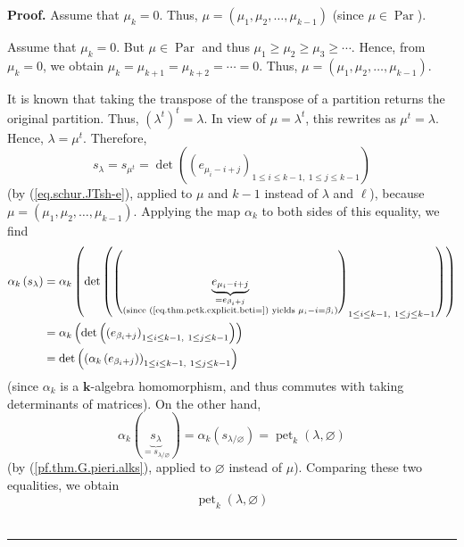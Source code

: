 \documentclass[numbers=enddot,12pt,final,onecolumn,notitlepage]{scrartcl}%
\theoremstyle{definition}
\newenvironment{proof}[1][Proof]{\noindent\textbf{#1.} }{\ \rule{0.5em}{0.5em}}
\newenvironment{verlong}{}{}
\newenvironment{vershort}{}{}
\begin{document}
\begin{proof}
\begin{vershort}
Assume that $\mu_{k}=0$. Thus, $\mu=\left(  \mu_{1},\mu_{2},\ldots,\mu
_{k-1}\right)  $ (since $\mu\in\operatorname*{Par}$).
\end{vershort}

\begin{verlong}
Assume that $\mu_{k}=0$. But $\mu\in\operatorname*{Par}$ and thus $\mu_{1}%
\geq\mu_{2}\geq\mu_{3}\geq\cdots$. Hence, from $\mu_{k}=0$, we obtain $\mu
_{k}=\mu_{k+1}=\mu_{k+2}=\cdots=0$. Thus, $\mu=\left(  \mu_{1},\mu_{2}%
,\ldots,\mu_{k-1}\right)  $.
\end{verlong}

It is known that taking the transpose of the transpose of a partition returns
the original partition. Thus, $\left(  \lambda^{t}\right)  ^{t}=\lambda$. In
view of $\mu=\lambda^{t}$, this rewrites as $\mu^{t}=\lambda$. Hence,
$\lambda=\mu^{t}$. Therefore,%
\[
s_{\lambda}=s_{\mu^{t}}=\det\left(  \left(  e_{\mu_{i}-i+j}\right)  _{1\leq
i\leq k-1,\ 1\leq j\leq k-1}\right)
\]
(by (\ref{eq.schur.JTsh-e}), applied to $\mu$ and $k-1$ instead of $\lambda$
and $\ell$), because $\mu=\left(  \mu_{1},\mu_{2},\ldots,\mu_{k-1}\right)  $.
Applying the map $\alpha_{k}$ to both sides of this equality, we find%
\begin{align*}
\alpha_{k}\left(  s_{\lambda}\right)   &  =\alpha_{k}\left(  \det\left(
\left(  \underbrace{e_{\mu_{i}-i+j}}_{\substack{=e_{\beta_{i}+j}\\\text{(since
(\ref{eq.thm.petk.explicit.beti=}) yields }\mu_{i}-i=\beta_{i}\text{)}%
}}\right)  _{1\leq i\leq k-1,\ 1\leq j\leq k-1}\right)  \right) \\
&  =\alpha_{k}\left(  \det\left(  \left(  e_{\beta_{i}+j}\right)  _{1\leq
i\leq k-1,\ 1\leq j\leq k-1}\right)  \right) \\
&  =\det\left(  \left(  \alpha_{k}\left(  e_{\beta_{i}+j}\right)  \right)
_{1\leq i\leq k-1,\ 1\leq j\leq k-1}\right)
\end{align*}
(since $\alpha_{k}$ is a $\mathbf{k}$-algebra homomorphism, and thus commutes
with taking determinants of matrices). On the other hand,%
\[
\alpha_{k}\left(  \underbrace{s_{\lambda}}_{=s_{\lambda/\varnothing}}\right)
=\alpha_{k}\left(  s_{\lambda/\varnothing}\right)  =\operatorname*{pet}%
\nolimits_{k}\left(  \lambda,\varnothing\right)
\]
(by (\ref{pf.thm.G.pieri.alks}), applied to $\varnothing$ instead of $\mu$).
Comparing these two equalities, we obtain%
\begin{equation}
\operatorname*{pet}\nolimits_{k}\left(  \lambda,\varnothing\right)

\end{equation}
\end{proof}
\end{document}
